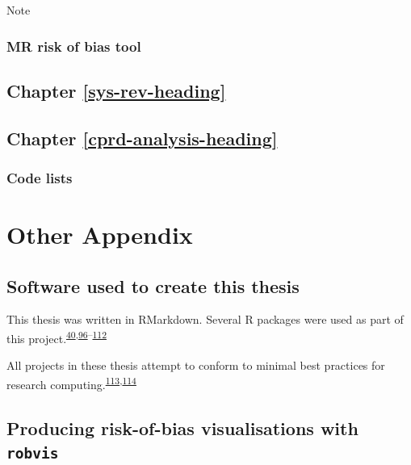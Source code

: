 \documentclass[a4paper, twoside]{templates/ociamthesis}
\begin{document}
Note

\hypertarget{appendix-mr-rob}{%
\subsection{MR risk of bias tool}\label{appendix-mr-rob}}

\hypertarget{appendix-sys-rev}{%
\section{Chapter \ref{sys-rev-heading}}\label{appendix-sys-rev}}

\hypertarget{appendix-cprd-analysis}{%
\section{Chapter \ref{cprd-analysis-heading}}\label{appendix-cprd-analysis}}

\hypertarget{code-lists}{%
\subsection{Code lists}\label{code-lists}}

\hypertarget{other-appendix-heading}{%
\chapter{Other Appendix}\label{other-appendix-heading}}

\hypertarget{software-used-to-create-this-thesis}{%
\section{Software used to create this thesis}\label{software-used-to-create-this-thesis}}

This thesis was written in RMarkdown. Several R packages were used as part of this project.\textsuperscript{\protect\hyperlink{ref-rbiorxiv}{40},\protect\hyperlink{ref-base}{96}--\protect\hyperlink{ref-xfun}{112}}

All projects in these thesis attempt to conform to minimal best practices for research computing.\textsuperscript{\protect\hyperlink{ref-wilson2014}{113},\protect\hyperlink{ref-wilson2017}{114}}

\hypertarget{appendix-robvis}{%
\section{\texorpdfstring{Producing risk-of-bias visualisations with \texttt{robvis}}{Producing risk-of-bias visualisations with robvis}}\label{appendix-robvis}}
\end{document}
